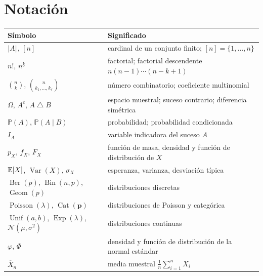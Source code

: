 \documentclass[11pt,a4paper,twoside,openany]{book}
\newcommand{\PP}{\mathbb{P}}
\newcommand{\Nor}{\mathcal{N}}
\newcommand{\Xbar}{\overline{X}}
\newcommand{\dsim}{\mathbin{\triangle}}
\DeclareMathOperator{\Var}{Var}
\DeclareMathOperator{\Ber}{Ber}
\DeclareMathOperator{\Bin}{Bin}
\DeclareMathOperator{\Geom}{Geom}
\DeclareMathOperator{\Poi}{Poisson}
\DeclareMathOperator{\Cat}{Cat}
\DeclareMathOperator{\Unif}{Unif}
\DeclareMathOperator{\Expo}{Exp}
\begin{document}
\section*{Notación}
\begin{center}
\begin{tabular}{@{}ll@{}}
\toprule
Símbolo & Significado \\
\midrule
$\lvert A\rvert$, $[n]$ & cardinal de un conjunto finito; $[n]=\{1,\dots,n\}$ \\
$n!$, $n^{\underline{k}}$ & factorial; factorial descendente $n(n-1)\cdots(n-k+1)$ \\
$\binom nk$, $\binom{n}{k_1,\dots,k_r}$ & número combinatorio; coeficiente multinomial \\
$\Omega$, $A^{c}$, $A\dsim B$ & espacio muestral; suceso contrario; diferencia simétrica \\
$\PP(A)$, $\PP(A\mid B)$ & probabilidad; probabilidad condicionada \\
$I_A$ & variable indicadora del suceso $A$ \\
$p_X$, $f_X$, $F_X$ & función de masa, densidad y función de distribución de $X$ \\
$\mathbb{E}[X]$, $\Var(X)$, $\sigma_X$ & esperanza, varianza, desviación típica \\
$\Ber(p)$, $\Bin(n,p)$, $\Geom(p)$ & distribuciones discretas \\
$\Poi(\lambda)$, $\Cat(\bm p)$ & distribuciones de Poisson y categórica \\
$\Unif(a,b)$, $\Expo(\lambda)$, $\Nor(\mu,\sigma^{2})$ & distribuciones continuas \\
$\varphi$, $\Phi$ & densidad y función de distribución de la normal estándar \\
$\Xbar_n$ & media muestral $\frac1n\sum_{i=1}^{n}X_i$ \\
\bottomrule
\end{tabular}
\end{center}

\tableofcontents

\mainmatter







\appendix


\backmatter

\end{document}
